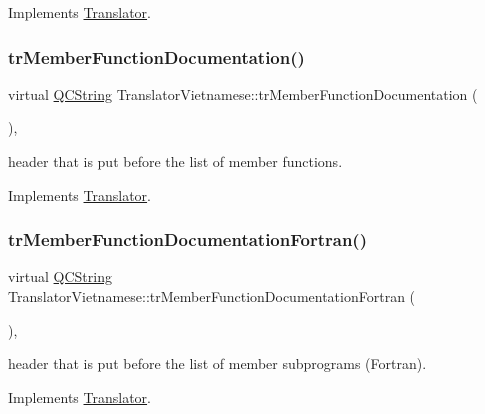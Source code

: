 Implements \mbox{\hyperlink{class_translator}{Translator}}.

\mbox{\label{class_translator_vietnamese_aa61aa84f719d581ea36834c2714a116a}} 
\subsubsection{\texorpdfstring{trMemberFunctionDocumentation()}{trMemberFunctionDocumentation()}}
{\footnotesize\ttfamily virtual \mbox{\hyperlink{class_q_c_string}{Q\+C\+String}} Translator\+Vietnamese\+::tr\+Member\+Function\+Documentation (\begin{DoxyParamCaption}{ }\end{DoxyParamCaption})\hspace{0.3cm}{\ttfamily [inline]}, {\ttfamily [virtual]}}

header that is put before the list of member functions. 

Implements \mbox{\hyperlink{class_translator}{Translator}}.

\mbox{\label{class_translator_vietnamese_a24130d70d4b811186de1ec993a8b5215}} 
\subsubsection{\texorpdfstring{trMemberFunctionDocumentationFortran()}{trMemberFunctionDocumentationFortran()}}
{\footnotesize\ttfamily virtual \mbox{\hyperlink{class_q_c_string}{Q\+C\+String}} Translator\+Vietnamese\+::tr\+Member\+Function\+Documentation\+Fortran (\begin{DoxyParamCaption}{ }\end{DoxyParamCaption})\hspace{0.3cm}{\ttfamily [inline]}, {\ttfamily [virtual]}}

header that is put before the list of member subprograms (Fortran). 

Implements \mbox{\hyperlink{class_translator}{Translator}}.

